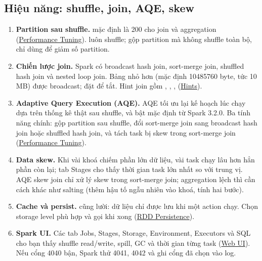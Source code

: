 \subsection{Hiệu năng: shuffle, join, AQE, skew}
\begin{enumerate}[resume]
  \item \textbf{Partition sau shuffle.}  mặc định là 200 cho join và aggregation (\href{https://spark.apache.org/docs/latest/sql-performance-tuning.html}{Performance Tuning}).  luôn shuffle;  gộp partition mà không shuffle toàn bộ, chỉ dùng để giảm số partition.
  \item \textbf{Chiến lược join.} Spark có broadcast hash join, sort-merge join, shuffled hash join và nested loop join. Bảng nhỏ hơn  (mặc định 10485760 byte, tức 10 MB) được broadcast; đặt  để tắt. Hint join gồm , , ,  (\href{https://spark.apache.org/docs/latest/sql-ref-syntax-qry-select-hints.html}{Hints}).
  \item \textbf{Adaptive Query Execution (AQE).} AQE tối ưu lại kế hoạch lúc chạy dựa trên thống kê thật sau shuffle, và bật mặc định từ Spark 3.2.0. Ba tính năng chính: gộp partition sau shuffle, đổi sort-merge join sang broadcast hash join hoặc shuffled hash join, và tách task bị skew trong sort-merge join (\href{https://spark.apache.org/docs/latest/sql-performance-tuning.html}{Performance Tuning}).
  \item \textbf{Data skew.} Khi vài khoá chiếm phần lớn dữ liệu, vài task chạy lâu hơn hẳn phần còn lại; tab Stages cho thấy thời gian task lớn nhất so với trung vị. AQE skew join chỉ xử lý skew trong sort-merge join; aggregation lệch thì cần cách khác như salting (thêm hậu tố ngẫu nhiên vào khoá, tính hai bước).
  \item \textbf{Cache và persist.}  cũng lười: dữ liệu chỉ được lưu khi một action chạy. Chọn storage level phù hợp và gọi  khi xong (\href{https://spark.apache.org/docs/latest/rdd-programming-guide.html\#rdd-persistence}{RDD Persistence}).
  \item \textbf{Spark UI.} Các tab Jobs, Stages, Storage, Environment, Executors và SQL cho bạn thấy shuffle read/write, spill, GC và thời gian từng task (\href{https://spark.apache.org/docs/latest/web-ui.html}{Web UI}). Nếu cổng 4040 bận, Spark thử 4041, 4042 và ghi cổng đã chọn vào log.
\end{enumerate}

